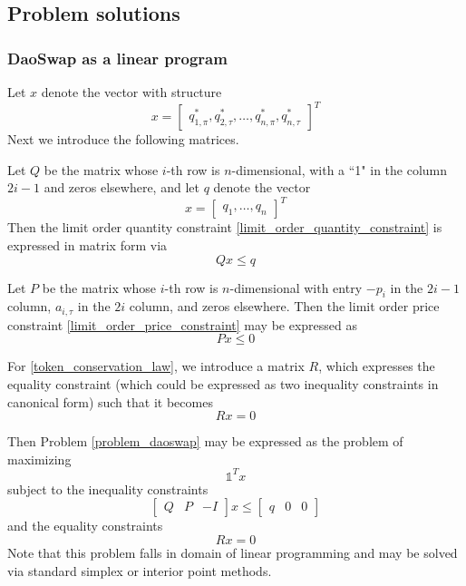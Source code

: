 \documentclass[11pt, reqno]{amsart}
\theoremstyle{definition}
\theoremstyle{remark}
\begin{document}

\subsection{Problem solutions}

\subsubsection{DaoSwap as a linear program}

Let $x$ denote the vector with structure
\[
    x =
    \begin{bmatrix}
        q_{1, \pi}^*, q_{2, \tau}^*, \ldots, q_{n, \pi}^*, q_{n, \tau}^*
    \end{bmatrix}^T
\]
Next we introduce the following matrices.

Let $Q$ be the matrix whose $i$-th row is $n$-dimensional, with a ``1" in the
column $2i - 1$ and zeros elsewhere, and let $q$ denote the vector
\[
    x =
    \begin{bmatrix}
        q_1, \ldots, q_n
    \end{bmatrix}^T
\]
Then the limit order quantity constraint
\eqref{limit_order_quantity_constraint}
is expressed in matrix form via
\[
    Q x \leq q
\]

Let $P$ be the matrix whose $i$-th row is $n$-dimensional with entry
$-p_i$ in the $2i - 1$ column, $a_{i, \tau}$ in the $2i$ column, and zeros
elsewhere. Then the limit order price constraint
\eqref{limit_order_price_constraint}
may be expressed as
\[
    P x \leq 0
\]

For \eqref{token_conservation_law}, we introduce a matrix $R$, which expresses
the equality constraint (which could be expressed as two inequality constraints
in canonical form) such that it becomes
\[
    R x = 0
\]

Then Problem \ref{problem_daoswap} may be expressed as the problem of maximizing
\[
    \mathbb{1}^T x
\]
subject to the inequality constraints
\[
    \begin{bmatrix} Q & P & -I \end{bmatrix} x \leq
    \begin{bmatrix} q & 0 & 0 \end{bmatrix}
\]
and the equality constraints
\[
    R x = 0
\]
Note that this problem falls in domain of linear programming and may be solved
via standard simplex or interior point methods.
\end{document}
